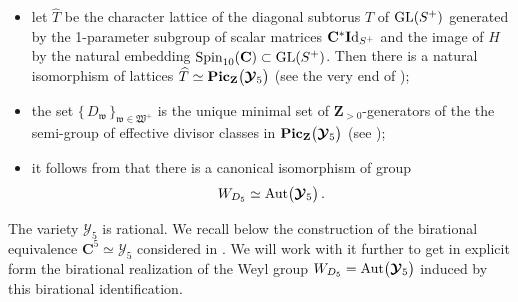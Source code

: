 \documentclass[11pt]{amsart}
\newcommand{\sk}{\smallskip}
\begin{document}
\begin{itemize}%
\item let $\widehat T$ be the character lattice of the diagonal  subtorus $T$ of $ {\rm GL}(S^+)$ generated by  the 1-parameter 
 subgroup of scalar matrices  
 $ \mathbf C^* {\bf I}{\rm d}_{S^+}$
 and 
the  image of $H$ by the natural embedding ${\rm Spin}_{10}(\mathbf C)\subset  {\rm GL}(S^+)$. 
Then there is a natural %
 isomorphism  of lattices $\widehat T\simeq 
{\bf Pic}_{\mathbf Z}\big( \boldsymbol{\mathcal Y}_5\big)$ (see the very end of \cite{SerganovaSkorobogatov}); 
\sk
\item 
the set $ \big\{ \,D_{\mathfrak w}\,\big\}_{ \mathfrak w \in \mathfrak W^+ }$ is the unique minimal set of $\mathbf Z_{>0}$-generators of the 
the semi-group of effective divisor classes in ${\bf Pic}_{\mathbf Z}\big( 
\boldsymbol{\mathcal Y}_5
\big)$ (see \cite[Theorem 1.6]{Skorobogatov}); 
\sk
\item  it follows from  \cite[Theorem 2.2.2]{Skorobogatov} that 
there is a canonical isomorphism of group 
\begin{equation}
\label{Eq:WD5=Aut(Y5)}
W_{D_5}\simeq {\rm Aut}
\big( 
\boldsymbol{\mathcal Y}_5
\big)\, . 
\end{equation}
\end{itemize}%

The variety $\boldsymbol{\mathcal Y}_5$ is rational.  We recall below the construction of 
 the birational equivalence $\mathbf C^5\simeq \boldsymbol{\mathcal Y}_5$  considered in \cite{PirioAFST}. We will work with it further to get  in explicit form the 
 birational realization of 
the Weyl group $W_{D_5}={\rm Aut}
\big( 
\boldsymbol{\mathcal Y}_5
\big)$ induced by this birational identification. \sk 
\end{document}
